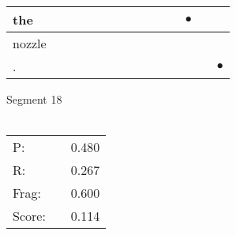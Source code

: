 \documentclass[landscape]{article}
\newcommand{\ssp}{\hspace{2pt}}
\newcommand{\mex}{\cellcolor{g}$\bullet$}
\begin{document}
\begin{tabular}{|l|p{10pt}|p{10pt}|p{10pt}|p{10pt}|p{10pt}|p{10pt}|p{10pt}|p{10pt}|p{10pt}|p{10pt}|p{10pt}|p{10pt}|p{10pt}|}
\hline
\ssp \cellcolor{ref10}the \ssp&\hspace{2pt}&\hspace{2pt}&\hspace{2pt}&\hspace{2pt}&\hspace{2pt}&\hspace{2pt}&\hspace{2pt}&\hspace{2pt}&\hspace{2pt}&\hspace{2pt}&\hspace{2pt}\mex&\hspace{2pt}&\hspace{2pt}\\
\hline
\ssp nozzle \ssp&\hspace{2pt}&\hspace{2pt}&\hspace{2pt}&\hspace{2pt}&\hspace{2pt}&\hspace{2pt}&\hspace{2pt}&\hspace{2pt}&\hspace{2pt}&\hspace{2pt}&\hspace{2pt}&\hspace{2pt}&\hspace{2pt}\\
\hline
\ssp \cellcolor{ref12}. \ssp&\hspace{2pt}&\hspace{2pt}&\hspace{2pt}&\hspace{2pt}&\hspace{2pt}&\hspace{2pt}&\hspace{2pt}&\hspace{2pt}&\hspace{2pt}&\hspace{2pt}&\hspace{2pt}&\hspace{2pt}&\hspace{2pt}\mex\\
\hline
\end{tabular}

\vspace{6pt}
\noindent Segment 18\\\\
\noindent\begin{tabular}{lm{12pt}r}
\hline
P:&&0.480\\
R:&&0.267\\
Frag:&&0.600\\
Score:&&0.114\\
\end{tabular}
\end{document}
